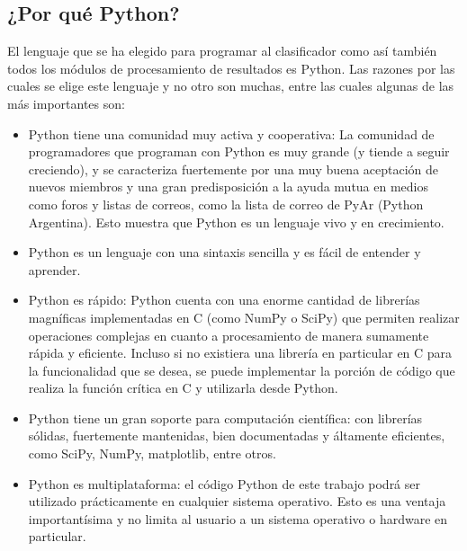 	\subsection{¿Por qué Python?}	
	
	El lenguaje que se ha elegido para programar al clasificador como así también todos los módulos de procesamiento de resultados es Python. Las razones por las cuales se elige este lenguaje y no otro son muchas, entre las cuales algunas de las más importantes son:
	
			\begin{itemize}
	
			\item Python tiene una comunidad muy activa y cooperativa: La comunidad de programadores que programan con Python es muy grande (y tiende a seguir creciendo), y se caracteriza fuertemente por una muy buena aceptación de nuevos miembros y una gran predisposición a la ayuda mutua en medios como foros y listas de correos, como la lista de correo de PyAr (Python Argentina). Esto muestra que Python es un lenguaje vivo y en crecimiento.
			
			\item Python es un lenguaje con una sintaxis sencilla y es fácil de entender y aprender.
			
			\item Python es rápido: Python cuenta con una enorme cantidad de librerías magníficas implementadas en C (como NumPy o SciPy) que permiten realizar operaciones complejas en cuanto a procesamiento de manera sumamente rápida y eficiente. Incluso si no existiera una librería en particular en C para la funcionalidad que se desea, se puede implementar la porción de código que realiza la función crítica en C y utilizarla desde Python.
			
			\item Python tiene un gran soporte para computación científica: con librerías sólidas, fuertemente mantenidas, bien documentadas y áltamente eficientes, como SciPy, NumPy, matplotlib, entre otros.
			
			\item Python es multiplataforma: el código Python de este trabajo podrá ser utilizado prácticamente en cualquier sistema operativo. Esto es una ventaja importantísima y no limita al usuario a un sistema operativo o hardware en particular.
			\end{itemize}

	